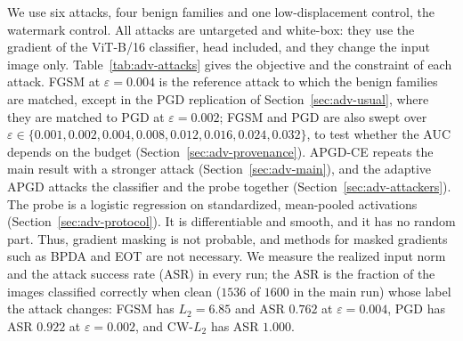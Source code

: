 \documentclass[../ppgc-tese.tex]{subfiles}
\begin{document}
We use six attacks, four benign families and one low-displacement control, the
watermark control. All attacks are untargeted and white-box: they use the
gradient of the ViT-B/16 classifier, head included, and they change the input
image only. Table~\ref{tab:adv-attacks} gives the objective and the constraint
of each attack. FGSM at $\varepsilon{=}0.004$ is the reference attack to which
the benign families are matched, except in the PGD replication of
Section~\ref{sec:adv-usual}, where they are matched to PGD at
$\varepsilon{=}0.002$; FGSM and PGD are also swept over
$\varepsilon\in\{0.001,0.002,0.004,0.008,0.012,0.016,0.024,0.032\}$, to test
whether the AUC depends on the budget (Section~\ref{sec:adv-provenance}).
APGD-CE repeats the main result with a stronger attack
(Section~\ref{sec:adv-main}), and the adaptive APGD attacks the classifier and
the probe together (Section~\ref{sec:adv-attackers}). The probe is a logistic
regression on standardized, mean-pooled activations
(Section~\ref{sec:adv-protocol}). It is differentiable and smooth, and it has
no random part. Thus, gradient masking is not probable, and methods for masked
gradients such as BPDA and EOT
\cite{athalye2018obfuscated_gradients,tramer2020adaptive_attacks} are not
necessary. We measure the realized input norm and the attack success rate
(ASR) in every run; the ASR is the fraction of the images classified correctly
when clean ($1536$ of $1600$ in the main run) whose label the attack changes:
FGSM has $L_2=6.85$ and ASR $0.762$ at $\varepsilon{=}0.004$, PGD has ASR
$0.922$ at $\varepsilon{=}0.002$, and CW-$L_2$ has ASR $1.000$.
\end{document}
